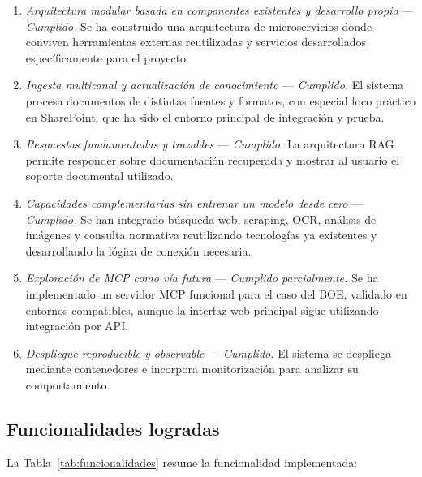 \begin{enumerate}
    \item \textit{Arquitectura modular basada en componentes existentes y desarrollo propio} --- \textit{Cumplido.} Se ha construido una arquitectura de microservicios donde conviven herramientas externas reutilizadas y servicios desarrollados específicamente para el proyecto.

    \item \textit{Ingesta multicanal y actualización de conocimiento} --- \textit{Cumplido.} El sistema procesa documentos de distintas fuentes y formatos, con especial foco práctico en SharePoint, que ha sido el entorno principal de integración y prueba.

    \item \textit{Respuestas fundamentadas y trazables} --- \textit{Cumplido.} La arquitectura RAG permite responder sobre documentación recuperada y mostrar al usuario el soporte documental utilizado.

    \item \textit{Capacidades complementarias sin entrenar un modelo desde cero} --- \textit{Cumplido.} Se han integrado búsqueda web, scraping, OCR, análisis de imágenes y consulta normativa reutilizando tecnologías ya existentes y desarrollando la lógica de conexión necesaria.

    \item \textit{Exploración de MCP como vía futura} --- \textit{Cumplido parcialmente.} Se ha implementado un servidor MCP funcional para el caso del BOE, validado en entornos compatibles, aunque la interfaz web principal sigue utilizando integración por API.

    \item \textit{Despliegue reproducible y observable} --- \textit{Cumplido.} El sistema se despliega mediante contenedores e incorpora monitorización para analizar su comportamiento.
\end{enumerate}

\subsection{Funcionalidades logradas}

La Tabla~\ref{tab:funcionalidades} resume la funcionalidad implementada:

